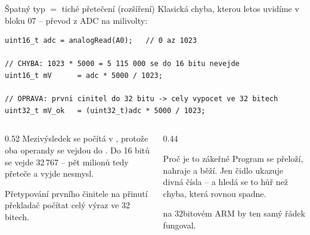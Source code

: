 \documentclass[12pt,aspectratio=169]{beamer}
\newcommand{\roz}{ {\normalfont\footnotesize\textcolor{SPSGrey}{(rozšíření)}}}
\begin{document}
\begin{frame}[fragile]{Špatný typ $=$ tiché přetečení\roz}
  Klasická chyba, kterou letos uvidíme v bloku 07 -- převod z ADC na milivolty:
\begin{lstlisting}[style=arduino_bez_cisel]
uint16_t adc = analogRead(A0);   // 0 az 1023

// CHYBA: 1023 * 5000 = 5 115 000 se do 16 bitu nevejde
uint16_t mV      = adc * 5000 / 1023;

// OPRAVA: prvni cinitel do 32 bitu -> cely vypocet ve 32 bitech
uint32_t mV_ok   = (uint32_t)adc * 5000 / 1023;
\end{lstlisting}

  \begin{columns}[T]
    \begin{column}{0.52\textwidth}
      \footnotesize
      Mezivýsledek  se počítá v , protože oba
      operandy se vejdou do . Do 16 bitů se vejde 32\,767 --
      pět milionů tedy přeteče a vyjde nesmysl.

      \vspace{1mm}
      Přetypování prvního činitele na  přinutí překladač počítat
      celý výraz ve 32 bitech.
    \end{column}
    \begin{column}{0.44\textwidth}
      \begin{alertblock}{Proč je to zákeřné}
        \scriptsize
        Program se přeloží, nahraje a běží. Jen čidlo ukazuje divná čísla --
        a hledá se to hůř než chyba, která rovnou spadne.
      \end{alertblock}
      \scriptsize
       na 32bitovém ARM by ten samý řádek fungoval.
    \end{column}
  \end{columns}
\end{frame}
\end{document}
